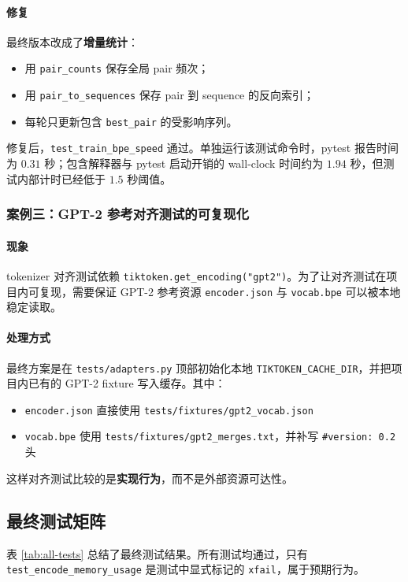 \documentclass[UTF8,a4paper,11pt]{ctexart}
\begin{document}
\paragraph{修复}
最终版本改成了\textbf{增量统计}：
\begin{itemize}[leftmargin=2em]
  \item 用 \texttt{pair\_counts} 保存全局 pair 频次；
  \item 用 \texttt{pair\_to\_sequences} 保存 pair 到 sequence 的反向索引；
  \item 每轮只更新包含 \texttt{best\_pair} 的受影响序列。
\end{itemize}
修复后，\texttt{test\_train\_bpe\_speed} 通过。单独运行该测试命令时，pytest 报告时间为 \(0.31\) 秒；包含解释器与 pytest 启动开销的 wall-clock 时间约为 \(1.94\) 秒，但测试内部计时已经低于 \(1.5\) 秒阈值。

\subsubsection{案例三：GPT-2 参考对齐测试的可复现化}
\paragraph{现象}
tokenizer 对齐测试依赖 \texttt{tiktoken.get\_encoding("gpt2")}。为了让对齐测试在项目内可复现，需要保证 GPT-2 参考资源 \texttt{encoder.json} 与 \texttt{vocab.bpe} 可以被本地稳定读取。

\paragraph{处理方式}
最终方案是在 \texttt{tests/adapters.py} 顶部初始化本地 \texttt{TIKTOKEN\_CACHE\_DIR}，并把项目内已有的 GPT-2 fixture 写入缓存。其中：
\begin{itemize}[leftmargin=2em]
  \item \texttt{encoder.json} 直接使用 \texttt{tests/fixtures/gpt2\_vocab.json}
  \item \texttt{vocab.bpe} 使用 \texttt{tests/fixtures/gpt2\_merges.txt}，并补写 \texttt{\#version: 0.2} 头
\end{itemize}
这样对齐测试比较的是\textbf{实现行为}，而不是外部资源可达性。

\subsection{最终测试矩阵}
表 \ref{tab:all-tests} 总结了最终测试结果。所有测试均通过，只有 \texttt{test\_encode\_memory\_usage} 是测试中显式标记的 \texttt{xfail}，属于预期行为。
\end{document}
